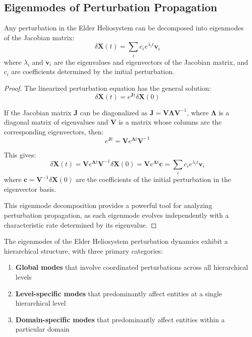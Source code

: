 \subsection{Eigenmodes of Perturbation Propagation}

\begin{theorem}
Any perturbation in the Elder Heliosystem can be decomposed into eigenmodes of the Jacobian matrix:
\begin{equation}
\delta\mathbf{X}(t) = \sum_i c_i e^{\lambda_i t} \mathbf{v}_i
\end{equation}
where $\lambda_i$ and $\mathbf{v}_i$ are the eigenvalues and eigenvectors of the Jacobian matrix, and $c_i$ are coefficients determined by the initial perturbation.
\end{theorem}

\begin{proof}
The linearized perturbation equation has the general solution:
\begin{equation}
\delta\mathbf{X}(t) = e^{\mathbf{J}t} \delta\mathbf{X}(0)
\end{equation}

If the Jacobian matrix $\mathbf{J}$ can be diagonalized as $\mathbf{J} = \mathbf{V} \mathbf{\Lambda} \mathbf{V}^{-1}$, where $\mathbf{\Lambda}$ is a diagonal matrix of eigenvalues and $\mathbf{V}$ is a matrix whose columns are the corresponding eigenvectors, then:
\begin{equation}
e^{\mathbf{J}t} = \mathbf{V} e^{\mathbf{\Lambda}t} \mathbf{V}^{-1}
\end{equation}

This gives:
\begin{equation}
\delta\mathbf{X}(t) = \mathbf{V} e^{\mathbf{\Lambda}t} \mathbf{V}^{-1} \delta\mathbf{X}(0) = \mathbf{V} e^{\mathbf{\Lambda}t} \mathbf{c} = \sum_i c_i e^{\lambda_i t} \mathbf{v}_i
\end{equation}
where $\mathbf{c} = \mathbf{V}^{-1} \delta\mathbf{X}(0)$ are the coefficients of the initial perturbation in the eigenvector basis.

This eigenmode decomposition provides a powerful tool for analyzing perturbation propagation, as each eigenmode evolves independently with a characteristic rate determined by its eigenvalue.
\end{proof}

\begin{theorem}
The eigenmodes of the Elder Heliosystem perturbation dynamics exhibit a hierarchical structure, with three primary categories:
\begin{enumerate}
    \item \textbf{Global modes} that involve coordinated perturbations across all hierarchical levels
    \item \textbf{Level-specific modes} that predominantly affect entities at a single hierarchical level
    \item \textbf{Domain-specific modes} that predominantly affect entities within a particular domain
\end{enumerate}
\end{theorem}

